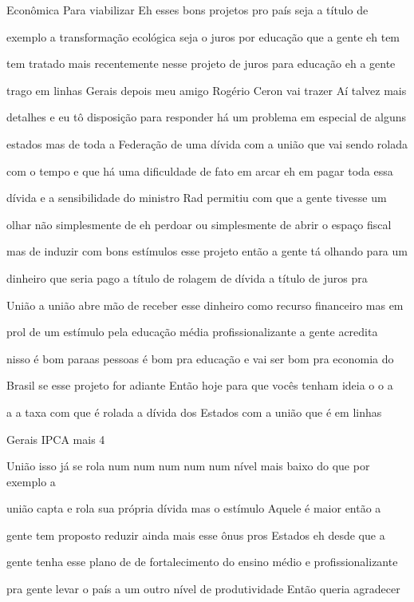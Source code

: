 \documentclass[a4paper,12pt]{article}
\begin{document}
Econômica Para viabilizar Eh esses bons projetos pro país seja a título de

exemplo a transformação ecológica seja o juros por educação que a gente eh tem

tem tratado mais recentemente nesse projeto de juros para educação eh a gente

trago em linhas Gerais depois meu amigo Rogério Ceron vai trazer Aí talvez mais

detalhes e eu tô disposição para responder há um problema em especial de alguns

estados mas de toda a Federação de uma dívida com a união que vai sendo rolada

com o tempo e que há uma dificuldade de fato em arcar eh em pagar toda essa

dívida e a sensibilidade do ministro Rad permitiu com que a gente tivesse um

olhar não simplesmente de eh perdoar ou simplesmente de abrir o espaço fiscal

mas de induzir com bons estímulos esse projeto então a gente tá olhando para um

dinheiro que seria pago a título de rolagem de dívida a título de juros pra

União a união abre mão de receber esse dinheiro como recurso financeiro mas em

prol de um estímulo pela educação média profissionalizante a gente acredita

nisso é bom paraas pessoas é bom pra educação e vai ser bom pra economia do

Brasil se esse projeto for adiante Então hoje para que vocês tenham ideia o o a

a a taxa com que é rolada a dívida dos Estados com a união que é em linhas

Gerais IPCA mais 4%

União isso já se rola num num num num num nível mais baixo do que por exemplo a

união capta e rola sua própria dívida mas o estímulo Aquele é maior então a

gente tem proposto reduzir ainda mais esse ônus pros Estados eh desde que a

gente tenha esse plano de de fortalecimento do ensino médio e profissionalizante

pra gente levar o país a um outro nível de produtividade Então queria agradecer
\end{document}
